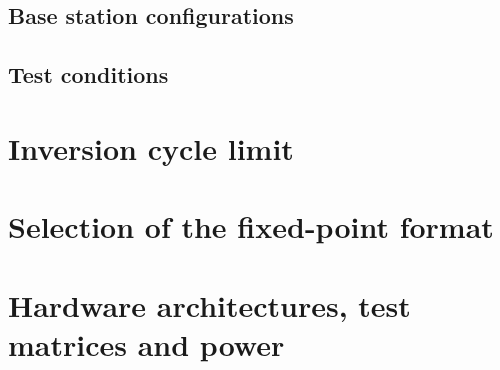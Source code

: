 \subsection{\texorpdfstring{Base station configurations}{Base station configurations}}\label{subsec:configuracoes-bs}


\subsection{Test conditions}\label{subsec:setup_condicoes}


\section{\texorpdfstring{Inversion cycle limit}{Inversion cycle limit}}\label{sec:requisitos-tempo}


\section{\texorpdfstring{Selection of the fixed-point format}{Selection of the fixed-point format}}\label{sec:formato}


\section{\texorpdfstring{Hardware architectures, test matrices and power}{Hardware architectures, test matrices and power}}\label{sec:testes-hardware}

